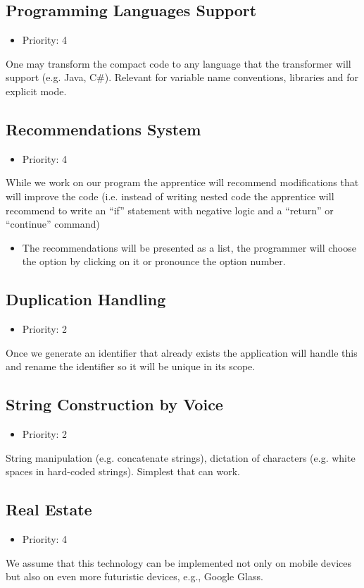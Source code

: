 \subsection{Programming Languages Support}
\begin{itemize}
	\item Priority: 4
\end{itemize}
One may transform the compact code to any language that the transformer will support (e.g. Java, C\#). Relevant for variable name conventions, libraries and for explicit mode.
\subsection{Recommendations System}
\begin{itemize}
	\item Priority: 4
\end{itemize}
While we work on our program the apprentice will recommend modifications that will improve the code (i.e. instead of writing nested code the apprentice will recommend to write an “if” statement with negative logic and a “return” or “continue” command)
\begin{itemize}
	\item The recommendations will be presented as a list, the programmer will choose the option by clicking on it or pronounce the option number.
\end{itemize}
\subsection{Duplication Handling}
\begin{itemize}
	\item Priority: 2
\end{itemize}
Once we generate an identifier that already exists the application will handle this and rename the identifier so it will be unique in its scope.
\subsection{String Construction by Voice}
\begin{itemize}
	\item Priority: 2
\end{itemize}
String manipulation (e.g. concatenate strings), dictation of characters (e.g. white spaces in hard-coded strings). Simplest that can work.
\subsection{Real Estate}
\begin{itemize}
	\item Priority: 4
\end{itemize}
We assume that this technology can be implemented not only on mobile devices but also on even more futuristic devices, e.g., Google Glass.
